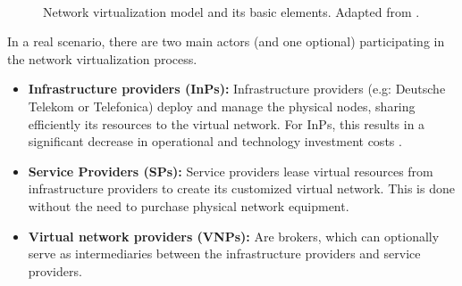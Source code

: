 \begin{figure}[bth]
	\myfloatalign
	 \quad
	 \\
	\caption{Network virtualization model and its basic elements. Adapted from \citep{carapinha2009network}.}
	\label{fig:networkvir}
\end{figure}

In a real scenario, there are two main actors (and one optional) participating in the network virtualization process.

\begin{itemize}
	
	\item \textbf{Infrastructure providers (InPs):} Infrastructure providers (e.g: Deutsche Telekom or Telefonica) deploy and manage the physical nodes, sharing efficiently its resources to the virtual network. For InPs, this results in a significant decrease in operational and technology investment costs \citep{dietrich2015multi}.
	\item \textbf{Service Providers (SPs):} Service providers lease virtual resources from infrastructure providers to create its customized virtual network. This is done without the need to purchase physical network equipment.
		\item \textbf{Virtual network providers (VNPs):} Are brokers, which can optionally serve as intermediaries between the infrastructure providers and service providers.
\end{itemize}

